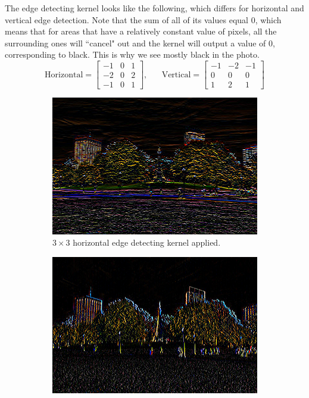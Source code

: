 \documentclass{article}
\begin{document}
    \begin{example}
      The edge detecting kernel looks like the following, which differs for horizontal and vertical edge detection. Note that the sum of all of its values equal $0$, which means that for areas that have a relatively constant value of pixels, all the surrounding ones will ``cancel" out and the kernel will output a value of $0$, corresponding to black. This is why we see mostly black in the photo. 
      \[\text{Horizontal} = \begin{bmatrix} -1 & 0 & 1 \\ -2 & 0 & 2 \\ -1 & 0 & 1 \end{bmatrix}, \;\;\;\;\;\; \text{Vertical} = \begin{bmatrix} -1 & -2 & -1 \\ 0 & 0 & 0 \\ 1 & 2 & 1 \end{bmatrix}\]
      \begin{figure}[H]
          \centering
          \begin{subfigure}[b]{0.45\textwidth}
          \centering
              \includegraphics[width=\textwidth]{img/Horizontal.png}
              \caption{$3 \times 3$ horizontal edge detecting kernel applied. }
              \label{fig:Horizontal}
          \end{subfigure}
          \begin{subfigure}[b]{0.45\textwidth}
          \centering
              \includegraphics[width=\textwidth]{img/Vertical.png}

\end{subfigure}
\end{figure}
\end{example}
\end{document}
